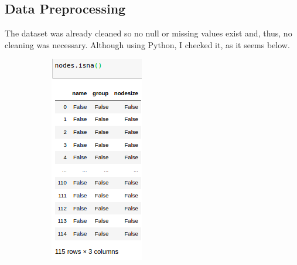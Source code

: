 \documentclass[12pt]{article}
\begin{document}
	\subsection{Data Preprocessing}
		The dataset was already cleaned so no null or missing values exist and, thus, no cleaning was necessary. Although using Python, I checked it, as it seems below.\\
		\begin{figure}[ht]
			\begin{subfigure}[b]{0.24\textwidth}
				\includegraphics[width=\textwidth]{nodesnan}

\end{subfigure}
\end{figure}
\end{document}
